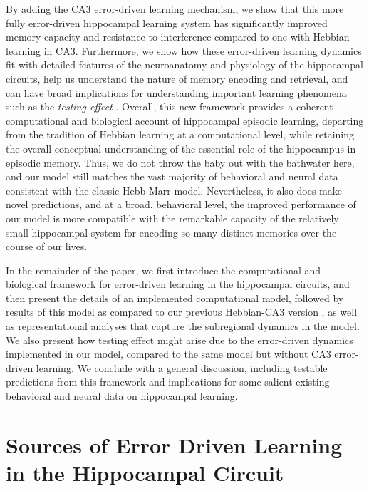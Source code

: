 \documentclass[11pt,twoside]{article}
\newif\myifpdf
\begin{document}
By adding the CA3 error-driven learning mechanism, we show that this more fully error-driven hippocampal learning system has significantly improved memory capacity and resistance to interference compared to one with Hebbian learning in CA3.  Furthermore, we show how these error-driven learning dynamics fit with detailed features of the neuroanatomy and physiology of the hippocampal circuits, help us understand the nature of memory encoding and retrieval, and can have broad implications for understanding important learning phenomena such as the \emph{testing effect} \citep{LiuOReillyRanganath21}.  Overall, this new framework provides a coherent computational and biological account of hippocampal episodic learning, departing from the tradition of Hebbian learning at a computational level, while retaining the overall conceptual understanding of the essential role of the hippocampus in episodic memory.  Thus, we do not throw the baby out with the bathwater here, and our model still matches the vast majority of behavioral and neural data consistent with the classic Hebb-Marr model.  Nevertheless, it also does make novel predictions, and at a broad, behavioral level, the improved performance of our model is more compatible with the remarkable capacity of the relatively small hippocampal system for encoding so many distinct memories over the course of our lives.

In the remainder of the paper, we first introduce the computational and biological framework for error-driven learning in the hippocampal circuits, and then present the details of an implemented computational model, followed by results of this model as compared to our previous Hebbian-CA3 version \citep{KetzMorkondaOReilly13}, as well as representational analyses that capture the subregional dynamics in the model.  We also present how testing effect might arise due to the error-driven dynamics implemented in our model, compared to the same model but without CA3 error-driven learning.  We conclude with a general discussion, including testable predictions from this framework and implications for some salient existing behavioral and neural data on hippocampal learning.

\section{Sources of Error Driven Learning in the Hippocampal Circuit}
\end{document}
